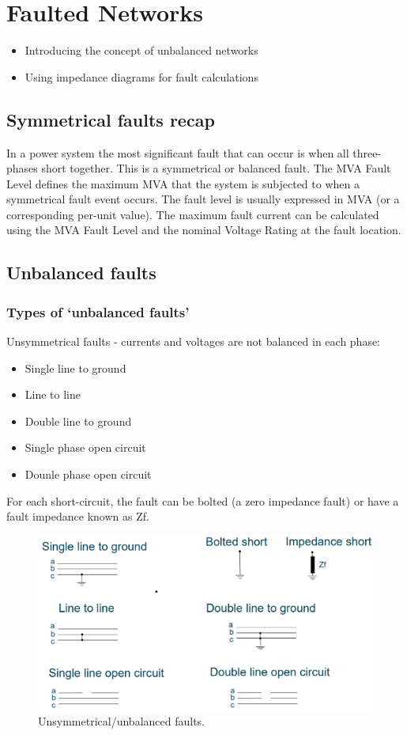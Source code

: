 \chapter{Faulted Networks}
\begin{itemize}
	\item Introducing the concept of unbalanced networks
	\item Using impedance diagrams for fault calculations
\end{itemize}
\section{Symmetrical faults recap}
In a power system the most significant fault that can occur is when all three-phases short together. This is a symmetrical or balanced fault. The MVA Fault Level defines the maximum MVA that the system is subjected to when a symmetrical fault event occurs. The fault level is usually expressed in MVA (or a corresponding per-unit value). The maximum fault current can be calculated using the MVA Fault Level and the nominal Voltage Rating at the fault location.
\section{Unbalanced faults}
\subsection{Types of `unbalanced faults'}
Unsymmetrical faults - currents and voltages are not balanced in each phase:
\begin{itemize}
	\item Single line to ground
	\item Line to line
	\item Double line to ground
	\item Single phase open circuit
	\item Dounle phase open circuit
\end{itemize}
For each short-circuit, the fault can be bolted (a zero impedance fault) or have a fault impedance known as Zf.
\begin{figure}[H]
	\centering
	\includegraphics[width = \textwidth]{./img/figure20.png}
	\caption{Unsymmetrical/unbalanced faults.}
\end{figure}
